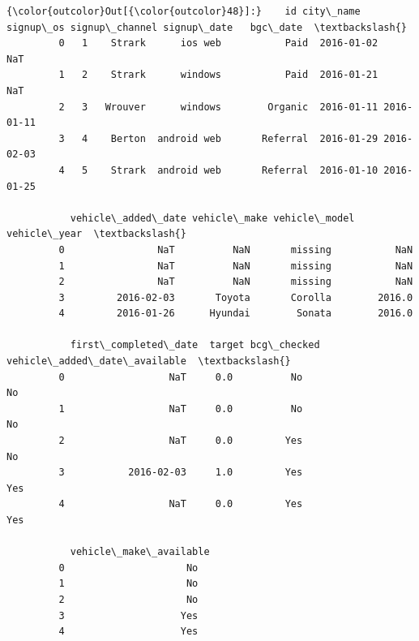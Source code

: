 \documentclass[11pt]{article}
\begin{document}
\begin{Verbatim}[commandchars=\\\{\}]
{\color{outcolor}Out[{\color{outcolor}48}]:}    id city\_name    signup\_os signup\_channel signup\_date   bgc\_date  \textbackslash{}
         0   1    Strark      ios web           Paid  2016-01-02        NaT   
         1   2    Strark      windows           Paid  2016-01-21        NaT   
         2   3   Wrouver      windows        Organic  2016-01-11 2016-01-11   
         3   4    Berton  android web       Referral  2016-01-29 2016-02-03   
         4   5    Strark  android web       Referral  2016-01-10 2016-01-25   
         
           vehicle\_added\_date vehicle\_make vehicle\_model  vehicle\_year  \textbackslash{}
         0                NaT          NaN       missing           NaN   
         1                NaT          NaN       missing           NaN   
         2                NaT          NaN       missing           NaN   
         3         2016-02-03       Toyota       Corolla        2016.0   
         4         2016-01-26      Hyundai        Sonata        2016.0   
         
           first\_completed\_date  target bcg\_checked vehicle\_added\_date\_available  \textbackslash{}
         0                  NaT     0.0          No                           No   
         1                  NaT     0.0          No                           No   
         2                  NaT     0.0         Yes                           No   
         3           2016-02-03     1.0         Yes                          Yes   
         4                  NaT     0.0         Yes                          Yes   
         
           vehicle\_make\_available  
         0                     No  
         1                     No  
         2                     No  
         3                    Yes  
         4                    Yes  
\end{Verbatim}
            
\end{document}
